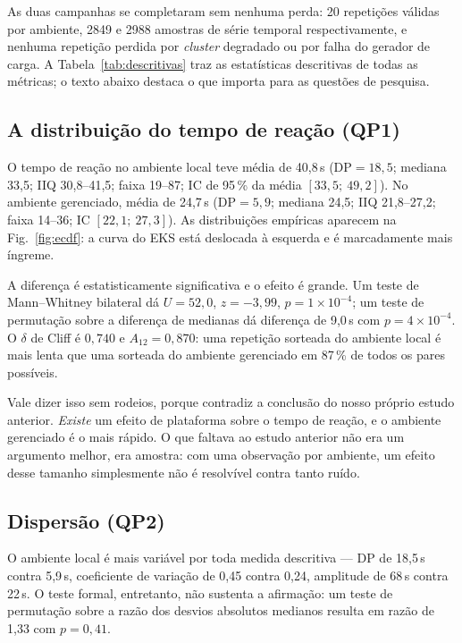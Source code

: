 \documentclass[conference]{IEEEtran}
\begin{document}
As duas campanhas se completaram sem nenhuma perda: 20 repetições válidas por
ambiente, 2849 e 2988 amostras de série temporal respectivamente, e nenhuma
repetição perdida por \emph{cluster} degradado ou por falha do gerador de carga.
A Tabela~\ref{tab:descritivas} traz as estatísticas descritivas de todas as
métricas; o texto abaixo destaca o que importa para as questões de pesquisa.



\subsection{A distribuição do tempo de reação (QP1)}

O tempo de reação no ambiente local teve média de 40,8\,s
($\mathrm{DP}=18{,}5$; mediana 33,5; IIQ 30,8--41,5; faixa 19--87; IC de 95\,\%
da média $[33{,}5;\ 49{,}2]$). No ambiente gerenciado, média de 24,7\,s
($\mathrm{DP}=5{,}9$; mediana 24,5; IIQ 21,8--27,2; faixa 14--36;
IC $[22{,}1;\ 27{,}3]$). As distribuições empíricas aparecem na
Fig.~\ref{fig:ecdf}: a curva do EKS está deslocada à esquerda e é
marcadamente mais íngreme.

A diferença é estatisticamente significativa e o efeito é grande. Um teste de
Mann--Whitney bilateral dá $U=52{,}0$, $z=-3{,}99$, $p=1\times10^{-4}$; um teste
de permutação sobre a diferença de medianas dá diferença de 9,0\,s com
$p=4\times10^{-4}$. O $\delta$ de Cliff é $0{,}740$ e $A_{12}=0{,}870$: uma
repetição sorteada do ambiente local é mais lenta que uma sorteada do ambiente
gerenciado em 87\,\% de todos os pares possíveis.

Vale dizer isso sem rodeios, porque contradiz a conclusão do nosso próprio estudo
anterior. \emph{Existe} um efeito de plataforma sobre o tempo de reação, e o
ambiente gerenciado é o mais rápido. O que faltava ao estudo anterior não era um
argumento melhor, era amostra: com uma observação por ambiente, um efeito desse
tamanho simplesmente não é resolvível contra tanto ruído.

\subsection{Dispersão (QP2)}

O ambiente local é mais variável por toda medida descritiva --- $\mathrm{DP}$ de
18,5\,s contra 5,9\,s, coeficiente de variação de 0,45 contra 0,24, amplitude de
68\,s contra 22\,s. O teste formal, entretanto, não sustenta a afirmação: um
teste de permutação sobre a razão dos desvios absolutos medianos resulta em razão
de 1,33 com $p=0{,}41$.
\end{document}
